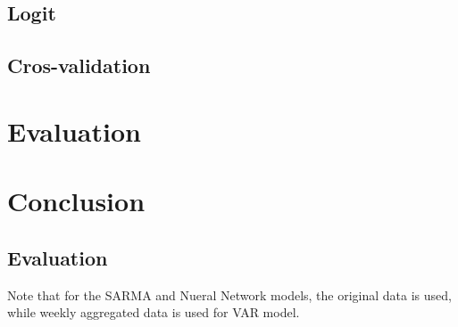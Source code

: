 \documentclass{article}
\begin{document}
\hypertarget{logit}{%
\subsection{Logit}\label{logit}}

\hypertarget{cros-validation}{%
\subsection{Cros-validation}\label{cros-validation}}

\hypertarget{evaluation}{%
\section{\texorpdfstring{Evaluation
\label{sec:evaluation}}{Evaluation }}\label{evaluation}}

\hypertarget{conclusion}{%
\section{Conclusion}\label{conclusion}}

\newpage

\hypertarget{evaluation-1}{%
\subsection{Evaluation}\label{evaluation-1}}

Note that for the SARMA and Nueral Network models, the original data is
used, while weekly aggregated data is used for VAR model.



\end{document}
